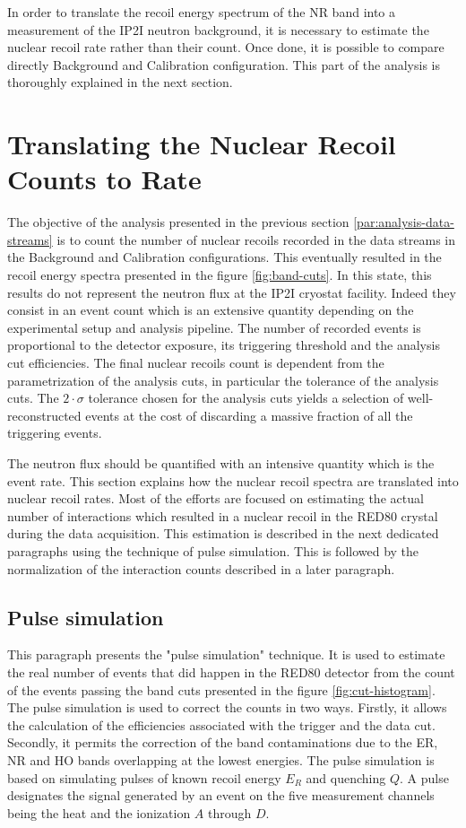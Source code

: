 In order to translate the recoil energy spectrum of the NR band into a measurement of the IP2I neutron background, it is necessary to estimate the nuclear recoil rate rather than their count. Once done, it is possible to compare directly Background and Calibration configuration. This part of the analysis is thoroughly explained in the next section.


\section{Translating the Nuclear Recoil Counts to Rate}

The objective of the analysis presented in the previous section \ref{par:analysis-data-streams} is to count the number of nuclear recoils recorded in the data streams in the Background and Calibration configurations. This eventually resulted in the recoil energy spectra presented in the figure \ref{fig:band-cuts}. In this state, this results do not represent the neutron flux at the IP2I cryostat facility. 
Indeed they consist in an event count which is an extensive quantity depending on the experimental setup and analysis pipeline. The number of recorded events is proportional to the detector exposure, its triggering threshold and the analysis cut efficiencies. The final nuclear recoils count is dependent from the parametrization of the analysis cuts, in particular the tolerance of the analysis cuts. The $2 \cdot \sigma$ tolerance chosen for the analysis cuts yields a selection of well-reconstructed events at the cost of discarding a massive fraction of all the triggering events. 

The neutron flux should be quantified with an intensive quantity which is the event rate. This section explains how the nuclear recoil spectra are translated into nuclear recoil rates. 
Most of the efforts are focused on estimating the actual number of interactions which resulted in a nuclear recoil in the RED80 crystal during the data acquisition. This estimation is described in the next dedicated paragraphs using the technique of pulse simulation.
This is followed by the normalization of the interaction counts described in a later paragraph.


\subsection{Pulse simulation}
\label{par:pulse-simulation}

This paragraph presents the "pulse simulation" technique. It is used to estimate the real number of events that did happen in the RED80 detector from the count of the events passing the band cuts presented in the figure \ref{fig:cut-histogram}. The pulse simulation is used to correct the counts in two ways. 
Firstly, it allows the calculation of the efficiencies associated with the trigger and the data cut. Secondly, it permits the correction of the band contaminations due to the ER, NR and HO bands overlapping at the lowest energies.
The pulse simulation is based on simulating pulses of known recoil energy $E_R$ and quenching $Q$. A pulse designates the signal generated by an event on the five measurement channels being the heat and the ionization $A$ through $D$.

